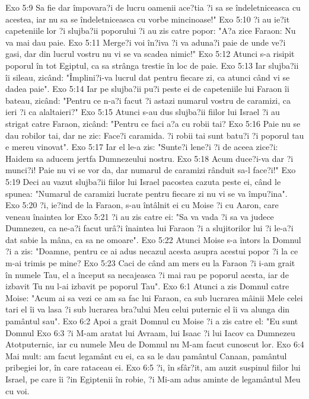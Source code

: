 Exo 5:9  Sa fie dar împovara?i de lucru oamenii ace?tia ?i sa se îndeletniceasca cu acestea, iar nu sa se îndeletniceasca cu vorbe mincinoase!"
Exo 5:10  ?i au ie?it capeteniile lor ?i slujba?ii poporului ?i au zis catre popor: "A?a zice Faraon: Nu va mai dau paie.
Exo 5:11  Merge?i voi în?iva ?i va aduna?i paie de unde ve?i gasi, dar din lucrul vostru nu vi se va scadea nimic!"
Exo 5:12  Atunci s-a risipit poporul în tot Egiptul, ca sa strânga trestie în loc de paie.
Exo 5:13  Iar slujba?ii îi sileau, zicând: "Împlini?i-va lucrul dat pentru fiecare zi, ca atunci când vi se dadea paie".
Exo 5:14  Iar pe slujba?ii pu?i peste ei de capeteniile lui Faraon îi bateau, zicând: "Pentru ce n-a?i facut ?i astazi numarul vostru de caramizi, ca ieri ?i ca alaltaieri?"
Exo 5:15  Atunci s-au dus slujba?ii fiilor lui Israel ?i au strigat catre Faraon, zicând: "Pentru ce faci a?a cu robii tai?
Exo 5:16  Paie nu se dau robilor tai, dar ne zic: Face?i caramida. ?i robii tai sunt batu?i ?i poporul tau e mereu vinovat".
Exo 5:17  Iar el le-a zis: "Sunte?i lene?i ?i de aceea zice?i: Haidem sa aducem jertfa Dumnezeului nostru.
Exo 5:18  Acum duce?i-va dar ?i munci?i! Paie nu vi se vor da, dar numarul de caramizi rânduit sa-l face?i!"
Exo 5:19  Deci au vazut slujba?ii fiilor lui Israel pacostea cazuta peste ei, când le spunea: "Numarul de caramizi lucrate pentru fiecare zi nu vi se va împu?ina".
Exo 5:20  ?i, ie?ind de la Faraon, s-au întâlnit ei cu Moise ?i cu Aaron, care veneau înaintea lor
Exo 5:21  ?i au zis catre ei: "Sa va vada ?i sa va judece Dumnezeu, ca ne-a?i facut urâ?i înaintea lui Faraon ?i a slujitorilor lui ?i le-a?i dat sabie la mâna, ca sa ne omoare".
Exo 5:22  Atunci Moise s-a întors la Domnul ?i a zis: "Doamne, pentru ce ai adus necazul acesta asupra acestui popor ?i la ce m-ai trimis pe mine?
Exo 5:23  Caci de când am mers eu la Faraon ?i i-am grait în numele Tau, el a început sa necajeasca ?i mai rau pe poporul acesta, iar de izbavit Tu nu l-ai izbavit pe poporul Tau".
Exo 6:1  Atunci a zis Domnul catre Moise: "Acum ai sa vezi ce am sa fac lui Faraon, ca sub lucrarea mâinii Mele celei tari el îi va lasa ?i sub lucrarea bra?ului Meu celui puternic el îi va alunga din pamântul sau".
Exo 6:2  Apoi a grait Domnul cu Moise ?i a zis catre el: "Eu sunt Domnul
Exo 6:3  ?i M-am aratat lui Avraam, lui Isaac ?i lui Iacov ca Dumnezeu Atotputernic, iar cu numele Meu de Domnul nu M-am facut cunoscut lor.
Exo 6:4  Mai mult: am facut legamânt cu ei, ca sa le dau pamântul Canaan, pamântul pribegiei lor, în care rataceau ei.
Exo 6:5  ?i, în sfâr?it, am auzit suspinul fiilor lui Israel, pe care îi ?in Egiptenii în robie, ?i Mi-am adus aminte de legamântul Meu cu voi.
